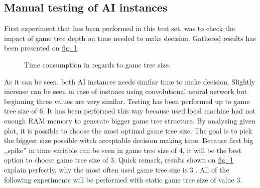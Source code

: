 \subsection{Manual testing of AI instances}\label{sec:manual-testing-ai}
First experiment that has been performed in this test set, was to check the impact of game tree depth on time needed to make decision. Gathered results has been presented on \hyperref[fig:move-making-time-consumption]{fig. \ref*{fig:move-making-time-consumption}}.
\begin{figure}
\centering
{}
\caption{Time consumption in regards to game tree size.}
\label{fig:move-making-time-consumption}
\end{figure}
As it can be seen, both AI instances needs similar time to make decision. Slightly increase can be seen in case of instance using convolutional neural network but beginning three values are very similar. Testing has been performed up to game tree size of $6$. It has been performed this way because used local machine had not enough RAM memory to generate bigger game tree structure. By analyzing given plot, it is possible to choose the most optimal game tree size. The goal is to pick the biggest size possible witch acceptable decision making time. Because first big ,,spike'' in time variable can be seen in game tree size of $4$, it will be the best option to choose game tree size of $3$. Quick remark, results shown on \hyperref[fig:move-making-time-consumption]{fig. \ref*{fig:move-making-time-consumption}} explain perfectly, why the most often used game tree size is $3$ \cite{bib:article-chessai-in-game-analysis,bib:internet-step-by-step-chess-ai}. All of the following experiments will be performed with static game tree size of value $3$.

